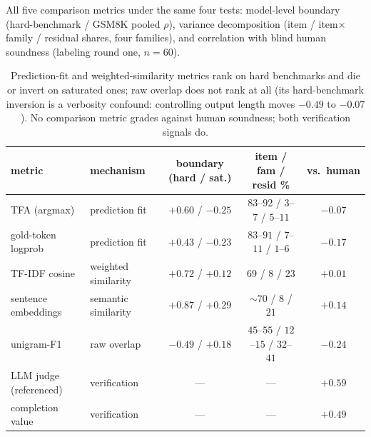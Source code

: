 \documentclass[11pt]{article}
\newcommand{\tfa}{\textsc{TFA}}
\begin{document}
All five comparison metrics under the same four tests: model-level boundary (hard-benchmark / \textsc{GSM8K} pooled $\rho$), variance decomposition (item / item$\times$family / residual shares, four families), and correlation with blind human soundness (labeling round one, $n{=}60$).

\begin{table}[h]
\centering
\small
\begin{tabular}{llccc}
\toprule
metric & mechanism & boundary (hard / sat.) & item / fam / resid \% & vs.\ human \\
\midrule
\tfa{} (argmax) & prediction fit & $+0.60$ / $-0.25$ & $83$--$92$ / $3$--$7$ / $5$--$11$ & $-0.07$ \\
gold-token logprob & prediction fit & $+0.43$ / $-0.23$ & $83$--$91$ / $7$--$11$ / $1$--$6$ & $-0.17$ \\
TF-IDF cosine & weighted similarity & $+0.72$ / $+0.12$ & $69$ / $8$ / $23$ & $+0.01$ \\
sentence embeddings & semantic similarity & $+0.87$ / $+0.29$ & $\sim$$70$ / $8$ / $21$ & $+0.14$ \\
unigram-F1 & raw overlap & $-0.49$ / $+0.18$ & $45$--$55$ / $12$--$15$ / $32$--$41$ & $-0.24$ \\
\midrule
LLM judge (referenced) & verification & --- & --- & $+0.59$ \\
completion value & verification & --- & --- & $+0.49$ \\
\bottomrule
\end{tabular}
\caption{Prediction-fit and weighted-similarity metrics rank on hard benchmarks and die or invert on saturated ones; raw overlap does not rank at all (its hard-benchmark inversion is a verbosity confound: controlling output length moves $-0.49$ to $-0.07$).
No comparison metric grades against human soundness; both verification signals do.}
\label{tab:classfull}
\end{table}
\end{document}
